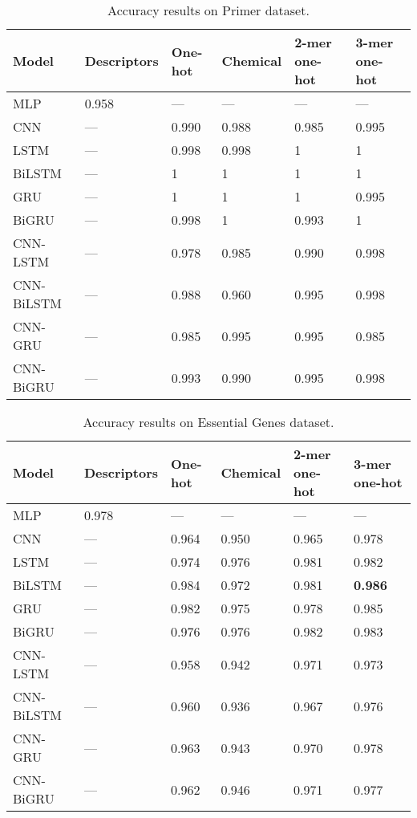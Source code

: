 \begin{table}[ht]
	\caption{Accuracy results on Primer dataset.}
	\label{tab:primer_results_compact}
    \centering
    \begin{tabular}{llllll}
    	\toprule
    	\textbf{Model} & \textbf{Descriptors} & \textbf{One-hot} & \textbf{Chemical} & \textbf{2-mer one-hot} & \textbf{3-mer one-hot}\\\midrule
    	
    	MLP & 0.958 & --- & --- & --- & --- \\\midrule
        CNN & --- & 0.990 & 0.988 & 0.985 & 0.995 \\\midrule 
        LSTM & --- & 0.998 & 0.998 & 1 & 1 \\\midrule 
        BiLSTM & --- & 1 & 1 & 1 & 1 \\\midrule 
        GRU & --- & 1 & 1 & 1 & 0.995 \\\midrule 
        BiGRU & --- & 0.998 & 1 & 0.993 & 1 \\\midrule 
        CNN-LSTM & --- & 0.978 & 0.985 & 0.990 & 0.998 \\\midrule 
        CNN-BiLSTM & --- & 0.988 & 0.960 & 0.995 & 0.998 \\\midrule 
        CNN-GRU & --- & 0.985 & 0.995 & 0.995 & 0.985 \\\midrule 
        CNN-BiGRU & --- & 0.993 & 0.990 & 0.995 & 0.998 \\ 
        
    	\bottomrule
    \end{tabular}
\end{table}

\begin{table}[ht]
	\caption{Accuracy results on Essential Genes dataset.}
	\label{tab:eg_results_compact}
    \centering
    \begin{tabular}{llllll}
    	\toprule
    	\textbf{Model} & \textbf{Descriptors} & \textbf{One-hot} & \textbf{Chemical} & \textbf{2-mer one-hot} & \textbf{3-mer one-hot}\\\midrule
    	
    	MLP & 0.978 & --- & --- & --- & --- \\\midrule
        CNN & --- & 0.964 & 0.950 & 0.965 & 0.978 \\\midrule 
        LSTM & --- & 0.974 & 0.976 & 0.981 & 0.982 \\\midrule
        BiLSTM & --- & 0.984 & 0.972 & 0.981 & \textbf{0.986} \\\midrule 
        GRU & --- & 0.982 & 0.975 & 0.978 & 0.985 \\\midrule 
        BiGRU & --- & 0.976 & 0.976 & 0.982 & 0.983 \\\midrule 
        CNN-LSTM & --- & 0.958 & 0.942 & 0.971 & 0.973 \\\midrule 
        CNN-BiLSTM & --- & 0.960 & 0.936 & 0.967 & 0.976 \\\midrule 
        CNN-GRU & --- & 0.963 & 0.943 & 0.970 & 0.978 \\\midrule 
        CNN-BiGRU & --- & 0.962 & 0.946 & 0.971 & 0.977 \\
        
    	\bottomrule
    \end{tabular}
\end{table}

